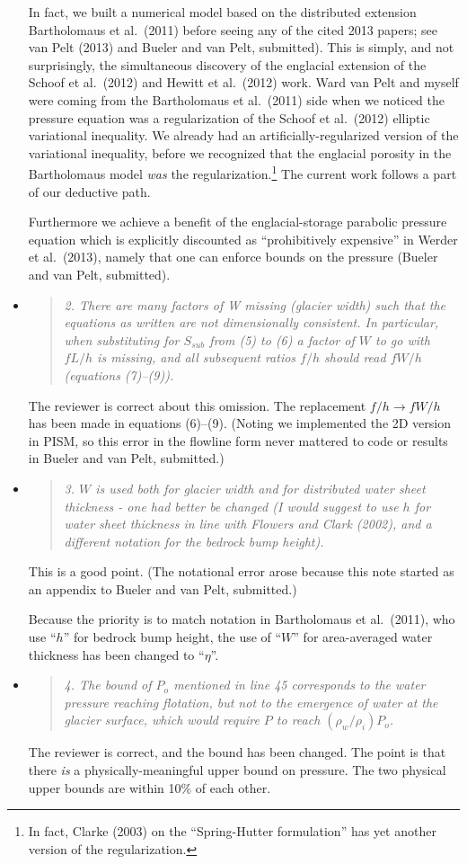 \documentclass[11pt,reqno]{amsart}
\newcommand{\reply}[2]{
\medskip\medskip
\item  \begin{quote}
\emph{#1}
\end{quote}

\medskip
\noindent #2}
\begin{document}
\begin{itemize}
{In fact, we built a numerical model based on the distributed extension Bartholomaus et al.~(2011) before seeing any of the cited 2013 papers; see van Pelt (2013) and Bueler and van Pelt, submitted).  This is simply, and not surprisingly, the simultaneous discovery of the englacial extension of the Schoof et al.~(2012) and Hewitt et al.~(2012) work.  Ward van Pelt and myself were coming from the Bartholomaus et al.~(2011) side when we noticed the pressure equation was a regularization of the Schoof et al.~(2012) elliptic variational inequality.  We already had an artificially-regularized version of the variational inequality, before we recognized that the englacial porosity in the Bartholomaus model \emph{was} the regularization.\footnote{In fact, Clarke (2003) on the ``Spring-Hutter formulation'' has yet another version of the regularization.}  The current work follows a part of our deductive path.

Furthermore we achieve a benefit of the englacial-storage parabolic pressure equation which is explicitly discounted as ``prohibitively expensive'' in Werder et al.~(2013), namely that one can enforce bounds on the pressure (Bueler and van Pelt, submitted).}

\reply{2. There are many factors of W missing (glacier width) such that the equations as written are not dimensionally consistent. In particular, when substituting for $S_{sub}$ from (5) to (6) a factor of $W$ to go with $f L/h$ is missing, and all subsequent ratios $f /h$ should read $f W/h$ (equations (7)--(9)).}
{The reviewer is correct about this omission.  The replacement $f/h \to fW/h$ has been made in equations (6)--(9).  (Noting we implemented the 2D version in PISM, so this error in the flowline form never mattered to code or results in Bueler and van Pelt, submitted.)}

\reply{3. $W$ is used both for glacier width and for distributed water sheet thickness - one had better be changed (I would suggest to use $h$ for water sheet thickness in line with Flowers and Clark (2002), and a different notation for the bedrock bump height).}
{This is a good point.  (The notational error arose because this note started as an appendix to Bueler and van Pelt, submitted.)

Because the priority is to match notation in Bartholomaus et al.~(2011), who use ``$h$'' for bedrock bump height, the use of ``$W$'' for area-averaged water thickness has been changed to ``$\eta$''.}

\reply{4. The bound of $P_o$ mentioned in line 45 corresponds to the water pressure reaching flotation, but not to the emergence of water at the glacier surface, which would require $P$ to reach $(\rho_w/\rho_i) P_o$.}
{The reviewer is correct, and the bound has been changed.  The point is that there \emph{is} a physically-meaningful upper bound on pressure.  The two physical upper bounds are within 10\% of each other.}


\end{itemize}
\end{document}
